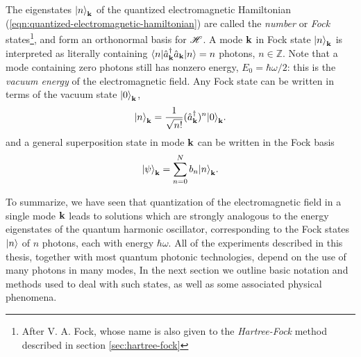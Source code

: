 The eigenstates $\mbox{$ | n \rangle $}_{\mathbf{k}}$ of the quantized electromagnetic Hamiltonian (\ref{eqn:quantized-electromagnetic-hamiltonian}) are called the \emph{number} or \emph{Fock} states\footnote{After V. A. Fock, whose name is also given to the \emph{Hartree-Fock} method described in section \ref{sec:hartree-fock}}, and form an orthonormal basis for $\mathscr{H}$. A mode $\mathbf{k}$ in Fock state $\mbox{$ | n \rangle $}_{\mathbf{k}}$ is interpreted as literally containing $\mbox{$ \langle n | $} \hat{a}^{\dagger}_{\mathbf{k}} \hat{a}_{\mathbf{k}} \mbox{$ | n \rangle $} = n$ photons, $n \in \mathbb{Z}$. Note that a mode containing zero photons still has nonzero energy, $E_0 = \hbar \omega /2$: this is the \emph{vacuum energy} of the electromagnetic field. Any Fock state can be written in terms of the vacuum state $\mbox{$ | 0 \rangle $}_{\mathbf{k}}$, 
\begin{equation}
    \mbox{$ | n \rangle $}_{\mathbf{k}} = \frac{1}{\sqrt{n!}}(\hat{a}^{\dagger}_{\mathbf{k}})^n \mbox{$ | 0 \rangle $}_{\mathbf{k}}.
\label{eqn:single-mode-fock-basis}
\end{equation}
and a general superposition state in mode $\mathbf{k}$ can be written in the Fock basis
\begin{equation}
    \mbox{$ | \psi \rangle $}_{\mathbf{k}} = \sum_{n=0}^N b_n \mbox{$ | n \rangle $}_{\mathbf{k}}.
\label{eqn:single-mode-fock-superposition}
\end{equation}
 
To summarize, we have seen that quantization of the electromagnetic field in a single mode $\mathbf{k}$ leads to solutions which are strongly analogous to the energy eigenstates of the quantum harmonic oscillator, corresponding to the Fock states $\mbox{$ | n \rangle $}$ of $n$ photons, each with energy $\hbar \omega$. All of the experiments described in this thesis, together with most quantum photonic technologies, depend on the use of many photons in many modes, In the next section we outline basic notation and methods used to deal with such states, as well as some associated physical phenomena.

